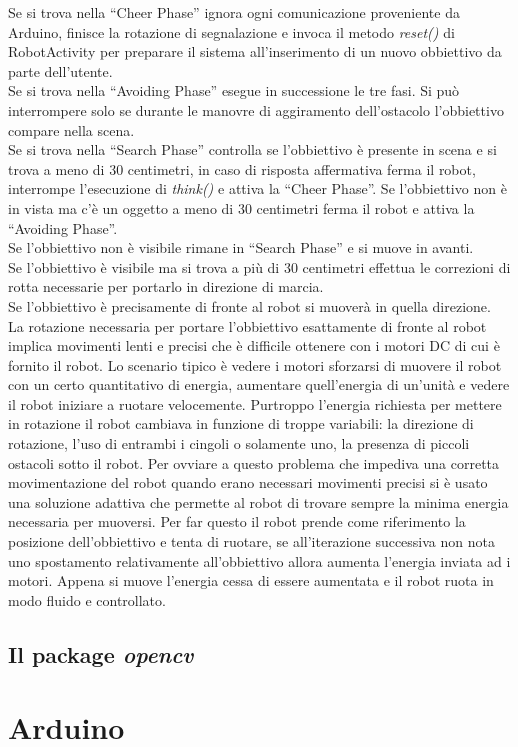 Se si trova nella ``Cheer Phase'' ignora ogni comunicazione proveniente da 
Arduino, finisce la rotazione di segnalazione e invoca il metodo \emph{reset()} di 
RobotActivity per preparare il sistema all'inserimento di un nuovo obbiettivo da 
parte dell'utente.\\
Se si trova nella ``Avoiding Phase'' esegue in successione le tre fasi. 
Si può interrompere solo se durante le manovre di aggiramento dell'ostacolo
l'obbiettivo compare nella scena.\\
Se si trova nella ``Search Phase'' controlla se l'obbiettivo è presente in scena e 
si trova a meno di 30 centimetri, in caso di risposta affermativa ferma il robot,
interrompe l'esecuzione di \emph{think()} e attiva la ``Cheer Phase''. 
Se l'obbiettivo non è in vista ma c'è un oggetto a meno di 30 centimetri ferma il robot
e attiva la ``Avoiding Phase''.\\
Se l'obbiettivo non è visibile rimane in ``Search Phase'' e si muove in avanti.\\
Se l'obbiettivo è visibile ma si trova a più di 30 centimetri effettua le correzioni di rotta
necessarie per portarlo in direzione di marcia.\\
Se l'obbiettivo è precisamente di fronte al robot si muoverà in quella direzione.\\ 
La rotazione necessaria per portare l'obbiettivo esattamente di fronte al robot 
implica movimenti lenti e precisi che è difficile ottenere con i motori DC di cui è
fornito il robot. Lo scenario tipico è vedere i motori sforzarsi di muovere il robot
con un certo quantitativo di energia, aumentare quell'energia di un'unità e vedere 
il robot iniziare a ruotare velocemente. Purtroppo l'energia richiesta per 
mettere in rotazione il robot cambiava in funzione di troppe variabili: 
la direzione di rotazione, l'uso di entrambi i cingoli o solamente uno, 
la presenza di piccoli ostacoli sotto il robot. Per ovviare a questo problema che impediva 
una corretta movimentazione del robot quando erano necessari movimenti precisi 
si è usato una soluzione adattiva che permette al robot di trovare sempre la 
minima energia necessaria per muoversi. Per far questo il robot prende come riferimento 
la posizione dell'obbiettivo e tenta di ruotare, se all'iterazione successiva 
non nota uno spostamento relativamente all'obbiettivo allora aumenta 
l'energia inviata ad i motori. Appena si muove l'energia cessa di essere 
aumentata e il robot ruota in modo fluido e controllato.
\subsection {Il package \textit{opencv}}


 



\section {Arduino} 